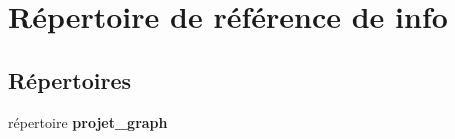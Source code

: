 \section{Répertoire de référence de info}
\label{dir_1d99b6067a30eb38056a1a74a1d1f1ad}
\subsection*{Répertoires}
\begin{DoxyCompactItemize}
\item 
répertoire {\bf projet\-\_\-graph}
\end{DoxyCompactItemize}
